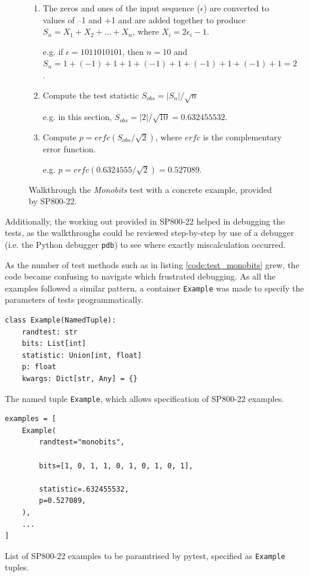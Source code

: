 \documentclass[11pt]{article}
\begin{document}
\begin{figure}[htbp]
  \begin{enumerate}
    \item The zeros and ones of the input sequence ($\epsilon$) are converted to values of –1 and +1 and are added together to produce $S_n = X_1 + X_2 + ... + X_n$, where $X_i = 2\epsilon{}_i - 1$.
    
    e.g. if $\epsilon = 1011010101$, then $n = 10$ and $S_n = 1 + (-1) + 1 + 1 + (-1) + 1 + (-1) + 1 + (-1) + 1 = 2$.
    
    \item Compute the test statistic $S_{obs} = \left| S_n \right| / \sqrt{n}$
    
    e.g. in this section, $S_{obs} = \left| 2 \right| / \sqrt{10} = 0.632455532$.
    
    \item Compute $p = erfc(S_{obs} / \sqrt{2})$, where $erfc$ is the complementary error function.
    
    e.g. $p = erfc(0.6324555 / \sqrt{2}) = 0.527089$.
  \end{enumerate}
  \caption{Walkthrough the \textit{Monobits} test with a concrete example, provided by SP800-22.}
\end{figure}


Additionally, the working out provided in SP800-22 helped in debugging the tests, as the walkthroughs could be reviewed step-by-step by use of a debugger (i.e. the Python debugger \texttt{pdb}) to see where exactly miscalculation occurred.

As the number of test methods such as in listing \ref{code:test_monobits} grew,
the code became confusing to navigate which frustrated debugging. As all the
examples followed a similar pattern, a container \texttt{Example} was made to specify the parameters of  tests programmatically.

\begin{listing}[htbp]
\begin{verbatim}
class Example(NamedTuple):
    randtest: str
    bits: List[int]
    statistic: Union[int, float]
    p: float
    kwargs: Dict[str, Any] = {}
\end{verbatim}
\caption[\texttt{Example} definition]{The named tuple \texttt{Example}, which allows specification of SP800-22 examples.}
\end{listing}

\begin{listing}[htbp]
\begin{verbatim}
examples = [
    Example(
        randtest="monobits",

        bits=[1, 0, 1, 1, 0, 1, 0, 1, 0, 1],

        statistic=.632455532,
        p=0.527089,
    ),
    ...
]
\end{verbatim}
\caption{List of SP800-22 examples to be paramtrised by pytest, specified as \texttt{Example} tuples.}
\end{listing}
\end{document}
